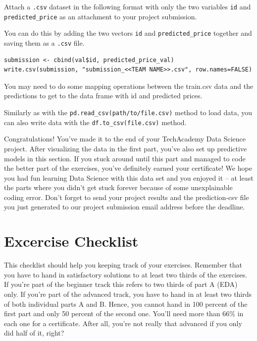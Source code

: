 \documentclass[
  11pt,
]{article}
\newenvironment{tips}[1]
  {
  \begin{itemize}
  \footnotesize
  \renewcommand{\labelitemi}{
    \raisebox{-.7\height}[0pt][0pt]{
      {\setkeys{Gin}{width=3em,keepaspectratio}
        \texttt{[image: images/\#1.png]}}
    }
  }
  \setlength{\fboxsep}{1em}
  \begin{rbox}
  \item
  }
  {
  \end{rbox}
  \end{itemize}
  }
\newenvironment{tipsp}[1]
  {
  \begin{itemize}
  \footnotesize
  \renewcommand{\labelitemi}{
    \raisebox{-.7\height}[0pt][0pt]{
      {\setkeys{Gin}{width=3em,keepaspectratio}
        \texttt{[image: images/\#1.png]}}
    }
  }
  \setlength{\fboxsep}{1em}
  \begin{pbox}
  \item
  }
  {
  \end{pbox}
  \end{itemize}
  }
\begin{document}
Attach a \texttt{.csv} dataset in the following format with only the two variables \texttt{id} and \texttt{predicted\_price} as an attachment to your project submission.

\begin{tips}r

You can do this by adding the two vectors \texttt{id} and \texttt{predicted\_price} together and saving them as a \texttt{.csv} file.

\begin{verbatim}
submission <- cbind(val$id, predicted_price_val)
write.csv(submission, "submission_<<TEAM NAME>>.csv", row.names=FALSE)
\end{verbatim}

\end{tips}

\begin{tipsp}p

You may need to do some mapping operations between the train.csv data and the predictions to get to the data frame with id and predicted prices.

Similarly as with the \texttt{pd.read\_csv(path/to/file.csv)} method to load data, you can also write data with the \texttt{df.to\_csv(file.csv)} method.

\end{tipsp}

Congratulations! You've made it to the end of your TechAcademy Data Science project. After visualizing the data in the first part, you've also set up predictive models in this section. If you stuck around until this part and managed to code the better part of the exercises, you've definitely earned your certificate! We hope you had fun learning Data Science with this data set and you enjoyed it -- at least the parts where you didn't get stuck forever because of some unexplainable coding error. Don't forget to send your project results and the prediction-csv file you just generated to our project submission email address before the deadline.

\newpage

\hypertarget{excercise-checklist}{%
\section{Excercise Checklist}\label{excercise-checklist}}

This checklist should help you keeping track of your exercises. Remember that you have to hand in satisfactory solutions to at least two thirds of the exercises. If you're part of the beginner track this refers to two thirds of part A (EDA) only. If you're part of the advanced track, you have to hand in at least two thirds of both individual parts A and B. Hence, you cannot hand in 100 percent of the first part and only 50 percent of the second one. You'll need more than 66\% in each one for a certificate. After all, you're not really that advanced if you only did half of it, right?
\end{document}
